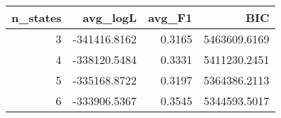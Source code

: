 \begin{tabular}{rrrr}
\toprule
n_states & avg_logL & avg_F1 & BIC \\
\midrule
3 & -341416.8162 & 0.3165 & 5463609.6169 \\
4 & -338120.5484 & 0.3331 & 5411230.2451 \\
5 & -335168.8722 & 0.3197 & 5364386.2113 \\
6 & -333906.5367 & 0.3545 & 5344593.5017 \\
\bottomrule
\end{tabular}
